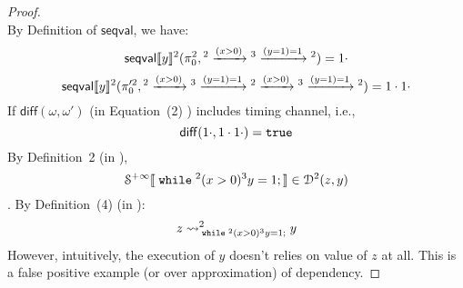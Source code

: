 \begin{example}
\begin{proof}
\[\]
%
By Definition of $\mathsf{seqval}$, we have:
\[
	\mathsf{seqval}\llbracket y \rrbracket{}^2(\pi_0^2, {}^2 \xrightarrow{(x > 0)} {}^3 \xrightarrow{(y = 1) = 1} {}^2 ) = 1 \cdot
\]
%
\[
	\mathsf{seqval}\llbracket y \rrbracket{}^2(\pi_0'^2, {}^2 \xrightarrow{(x > 0)} {}^3 \xrightarrow{(y = 1) = 1} {}^2 \xrightarrow{(x > 0)} {}^3 \xrightarrow{(y = 1) = 1}{}^2 ) = 1 \cdot 1 \cdot
\]
%
If $\mathsf{diff}(\omega, \omega')$ (in \cite{cousot2019abstract} Equation~(2) ) includes timing channel, i.e., 
%
\[
	\mathsf{diff}(1 \cdot, 1 \cdot 1 \cdot) = \mathtt{true}
\]
%
By Definition~2 (in \cite{cousot2019abstract}), 
\[
	\mathcal{S}^{+\infty}\llbracket \;\mathtt{while}\; {}^2 (x > 0) {}^3 y = 1; \rrbracket 
\in \mathcal{D}^2(z, y)
\].
%
By Definition~(4) (in \cite{cousot2019abstract}):
\[
	z \rightsquigarrow^{2}_{\;\mathtt{while}\; {}^2 (x > 0) {}^3 y = 1;} y
\]
%
However, intuitively, the execution of $y$ doesn't relies on value of $z$ at all. This is a false positive example (or over approximation) of dependency.
%
\end{proof}
\end{example}
%
\clearpage
\clearpage
